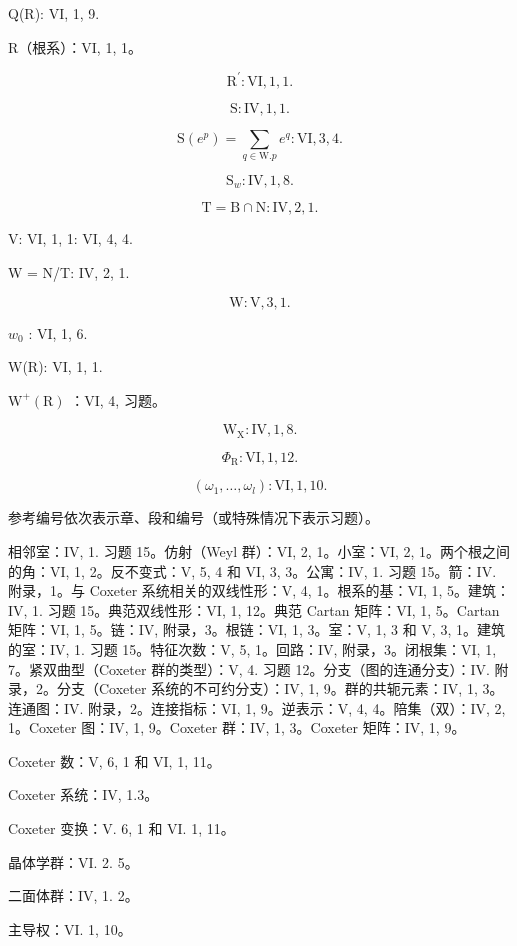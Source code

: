 Q(R): VI, 1, 9.

R（根系）：VI, 1, 1。

\[
\mathrm{R} ^ {\prime}: \mathrm{VI}, 1, 1.
\]

\[
\mathrm{S:IV,1,1.}
\]

\[
\mathrm{S} (e ^ {p}) = \sum_ {q \in \mathrm{W}. p} e ^ {q}: \mathrm{VI}, 3, 4.
\]

\[
\mathrm{S} _ {w}: \mathrm{IV}, 1, 8.
\]

\[
\mathrm{T} = \mathrm{B} \cap \mathrm{N}: \mathrm{IV}, 2, 1.
\]

V: VI, 1, 1: VI, 4, 4.

W = N/T: IV, 2, 1.

\[
\mathrm{W}: \mathrm{V}, 3, 1.
\]

\(w_{0}\) : VI, 1, 6.

W(R): VI, 1, 1.

\(\mathrm{W}^{+}(\mathrm{R})\) ：VI, 4, 习题。

\[
\mathrm{W} _ {\mathrm{X}}: \mathrm{IV}, 1, 8.
\]

\[
\Phi_ {\mathrm{R}}: \mathrm{VI}, 1, 12.
\]

\[
(\omega_ {1}, \dots , \omega_ {l}) \colon \mathrm{VI,1,10.}
\]


参考编号依次表示章、段和编号（或特殊情况下表示习题）。

相邻室：IV, 1. 习题 15。仿射（Weyl 群）：VI, 2, 1。小室：VI, 2, 1。两个根之间的角：VI, 1, 2。反不变式：V, 5, 4 和 VI, 3, 3。公寓：IV, 1. 习题 15。箭：IV. 附录，1。与 Coxeter 系统相关的双线性形：V, 4, 1。根系的基：VI, 1, 5。建筑：IV, 1. 习题 15。典范双线性形：VI, 1, 12。典范 Cartan 矩阵：VI, 1, 5。Cartan 矩阵：VI, 1, 5。链：IV, 附录，3。根链：VI, 1, 3。室：V, 1, 3 和 V, 3, 1。建筑的室：IV, 1. 习题 15。特征次数：V, 5, 1。回路：IV, 附录，3。闭根集：VI, 1, 7。紧双曲型（Coxeter 群的类型）：V, 4. 习题 12。分支（图的连通分支）：IV. 附录，2。分支（Coxeter 系统的不可约分支）：IV, 1, 9。群的共轭元素：IV, 1, 3。连通图：IV. 附录，2。连接指标：VI, 1, 9。逆表示：V, 4, 4。陪集（双）：IV, 2, 1。Coxeter 图：IV, 1, 9。Coxeter 群：IV, 1, 3。Coxeter 矩阵：IV, 1, 9。

Coxeter 数：V, 6, 1 和 VI, 1, 11。

Coxeter 系统：IV, 1.3。

Coxeter 变换：V. 6, 1 和 VI. 1, 11。

晶体学群：VI. 2. 5。

二面体群：IV, 1. 2。

主导权：VI. 1, 10。

